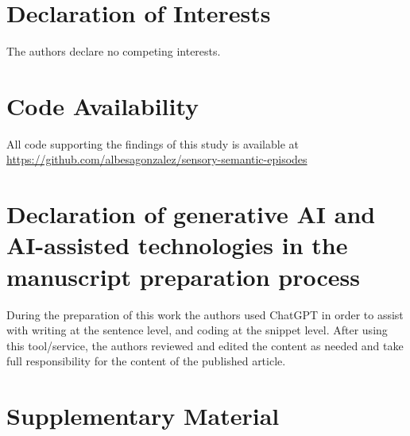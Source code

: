 \documentclass{article}
\begin{document}
\section*{Declaration of Interests}
The authors declare no competing interests.
\section*{Code Availability}
All code supporting the findings of this study is available at 
\url{https://github.com/albesagonzalez/sensory-semantic-episodes}
\section*{Declaration of generative AI and AI-assisted technologies in the manuscript preparation process}
During the preparation of this work the authors used ChatGPT in order to assist with writing at the sentence level, and coding at the snippet level. After using this tool/service, the authors reviewed and edited the content as needed and take full responsibility for the content of the published article.

\clearpage
\section*{Supplementary Material}
\renewcommand{\thefigure}{S\arabic{figure}}
\setcounter{figure}{0} %
\end{document}
